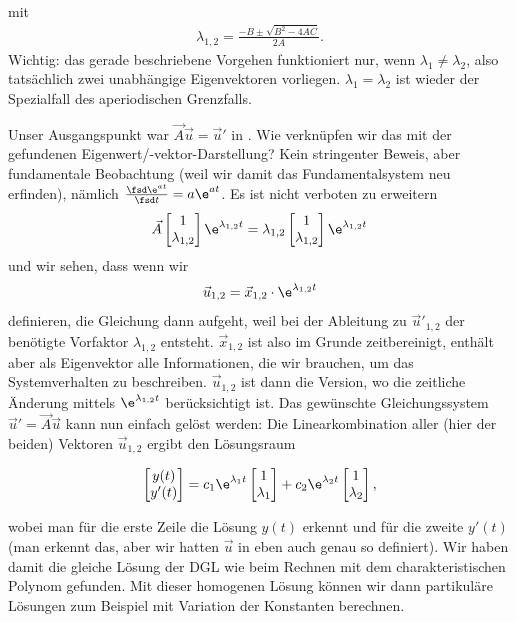 %
mit
\begin{align}
\lambda_{1,2} = \frac{-B \pm \sqrt{B^2-4 A C}}{2 A}.
\end{align}
%
Wichtig: das gerade beschriebene Vorgehen funktioniert nur, wenn
$\lambda_1 \neq \lambda_2$, also tatsächlich zwei unabhängige Eigenvektoren vorliegen.
%
$\lambda_1 = \lambda_2$ ist wieder der Spezialfall des aperiodischen Grenzfalls.

Unser Ausgangspunkt war $\vec{A}  \vec{u} = \vec{u}'$ in .
Wie verknüpfen wir das mit der gefundenen Eigenwert/-vektor-Darstellung?
%
Kein stringenter Beweis, aber fundamentale Beobachtung
(weil wir damit das Fundamentalsystem neu erfinden), nämlich
$\frac{\fsd \e^{a t}}{\fsd t} = a \e^{a t}$.
%
Es ist nicht verboten zu erweitern
\begin{align}
\vec{A}
\begin{bmatrix}
1 \\ \lambda_{1,2}
\end{bmatrix}
\e^{\lambda_{1,2} t}
= \lambda_{1,2}
\begin{bmatrix}
1 \\ \lambda_{1,2}
\end{bmatrix}
\e^{\lambda_{1,2} t}
\end{align}
und wir sehen, dass wenn wir
\begin{align}
\vec{u}_{1,2} = \vec{x}_{1,2} \cdot \e^{\lambda_{1,2} t}
\end{align}
definieren, die Gleichung  dann aufgeht, weil bei der Ableitung zu
$\vec{u}'_{1,2}$ der benötigte Vorfaktor $\lambda_{1,2}$ entsteht.
%
$\vec{x}_{1,2}$ ist also im Grunde zeitbereinigt, enthält aber als Eigenvektor
alle Informationen, die wir brauchen, um das Systemverhalten zu beschreiben.
%
$\vec{u}_{1,2}$ ist dann die Version, wo die zeitliche Änderung mittels
$\e^{\lambda_{1,2} t}$ berücksichtigt ist.
%
Das gewünschte Gleichungssystem $\vec{u}'=\vec{A}  \vec{u}$ kann nun einfach
gelöst werden:
%
Die Linearkombination aller (hier der beiden) Vektoren $\vec{u}_{1,2}$ ergibt den
Lösungsraum
\begin{mdframed}[backgroundcolor=C3!10]
\begin{align}
\begin{bmatrix}
y(t) \\ y'(t)
\end{bmatrix} =
c_1 \e^{\lambda_1 t}
\begin{bmatrix}
1 \\ \lambda_{1}
\end{bmatrix}
+
c_2 \e^{\lambda_2 t}
\begin{bmatrix}
1 \\ \lambda_{2}
\end{bmatrix},
\end{align}
\end{mdframed}
%
wobei man für die erste Zeile die Lösung $y(t)$ erkennt und für die zweite $y'(t)$
(man erkennt das, aber wir hatten $\vec{u}$ in 
eben auch genau so definiert).
%
Wir haben damit die gleiche Lösung der DGL wie beim Rechnen mit dem
charakteristischen Polynom gefunden.
%
Mit dieser homogenen Lösung können wir dann partikuläre Lösungen zum Beispiel mit
Variation der Konstanten berechnen.

